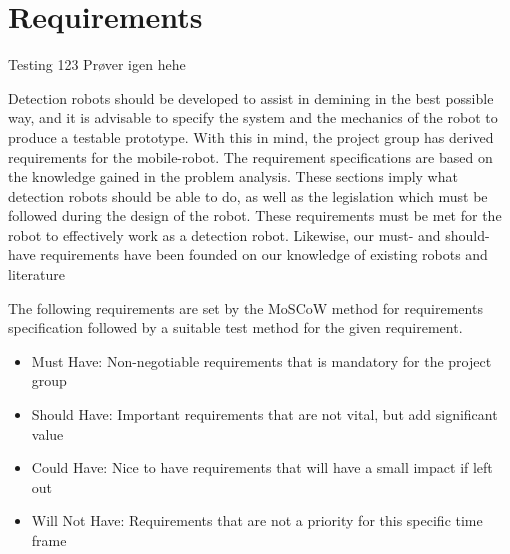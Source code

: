 
\chapter{Requirements}

Testing 123
Prøver igen hehe

Detection robots should be developed to assist in demining in the best possible way, and it is advisable to specify the system and the mechanics of the robot to produce a testable prototype. With this in mind, the project group has derived requirements for the mobile-robot. The requirement specifications are based on the knowledge gained in the problem analysis. These sections imply what detection robots should be able to do, as well as the legislation which must be followed during the design of the robot. These requirements must be met for the robot to effectively work as a detection robot. Likewise, our must- and should-have requirements have been founded on our knowledge of existing robots and literature\\

        \vspace{2mm}

The following requirements are set by the MoSCoW method for requirements specification followed by a suitable test method for the given requirement.

\begin{itemize}[label={}]
\setlength{\itemsep}{0.05\baselineskip}
    \item {} \normalsize Must Have: \hspace{5mm} Non-negotiable requirements that is mandatory for the project group \par
    \item {} \normalsize Should Have: \hspace{1.8mm} Important requirements that are not vital, but add significant value \par
    \item {} \normalsize Could Have: \hspace{3.5mm} Nice to have requirements that will have a small impact if left out \par
    \item {} \normalsize Will Not Have: Requirements that are not a priority for this specific time frame \par
\end{itemize}

